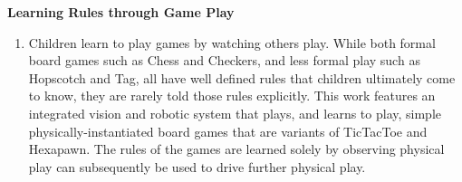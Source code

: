 \documentclass[10pt]{article}
\newenvironment{researchBlock}[2]{%
  \vspace*{0.5ex}
  {\large \textbf{#1}}
  \begin{enumerate}[\color{RoyalBlue}#2]\item}
  {\end{enumerate}}
\begin{document}
\begin{researchBlock}{Learning Rules through Game Play}{}
  Children learn to play games by watching others play. While both formal board
  games such as Chess and Checkers, and less formal play such as Hopscotch and
  Tag, all have well defined rules that children ultimately come to know, they
  are rarely told those rules explicitly. This work features an integrated
  vision and robotic system that plays, and learns to play, simple
  physically-instantiated board games that are variants of TicTacToe and
  Hexapawn. The rules of the games are learned solely by observing physical
  play can subsequently be used to drive further physical play.
\end{researchBlock}
\end{document}
